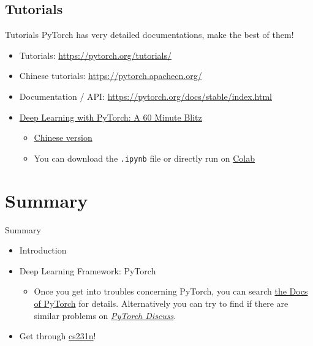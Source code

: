 \documentclass{../TexTemplate/myslide}
\begin{document}
\subsection{Tutorials}
\begin{frame}[fragile]{Tutorials}
PyTorch has very detailed documentations, make the best of them!
\begin{itemize}
	\item Tutorials: \url{https://pytorch.org/tutorials/}
	\item Chinese tutorials: \url{https://pytorch.apachecn.org/}
	\item Documentation / API: \url{https://pytorch.org/docs/stable/index.html}
	\item \href{https://pytorch.org/tutorials/beginner/deep_learning_60min_blitz.html}{Deep Learning with PyTorch: A 60 Minute Blitz}
	\begin{itemize}
		\item \href{https://pytorch.apachecn.org/docs/1.0/deep_learning_60min_blitz.html}{Chinese version}
		\item You can download the \verb'.ipynb' file or directly run on \href{https://colab.research.google.com/}{Colab}
	\end{itemize}
\end{itemize}
\end{frame}

\section{Summary}
\begin{frame}
\sectionpage
\end{frame}

\begin{frame}{Summary}
\begin{itemize}
	\item Introduction
	\item Deep Learning Framework: PyTorch
	\begin{itemize}
		\item Once you get into troubles concerning PyTorch, you can search \href{http://pytorch.org/docs/master/index.html}{the Docs of PyTorch} for details. Alternatively you can try to find if there are similar problems on \href{https://discuss.pytorch.org/}{\emph{PyTorch Discuss}}.
	\end{itemize}
	\item Get through \href{http://cs231n.github.io/}{cs231n}!
\end{itemize}
\end{frame}
\end{document}
